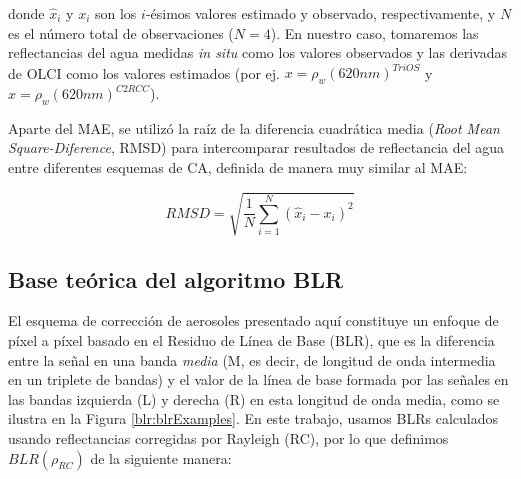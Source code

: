         \noindent donde $\hat{x}_{i}$ y $x_{i}$ son los $i$-ésimos valores estimado y observado, respectivamente, y $N$ es el número total de observaciones ($N=4$). En nuestro caso, tomaremos las reflectancias del agua medidas \textit{in situ} como los valores observados y las derivadas de OLCI como los valores estimados (por ej. $x=\rho_{w}(620 nm)^{TriOS}$ y $\hat{x}=\rho_{w}(620 nm)^{C2RCC}$). 

        Aparte del MAE, se utilizó la raíz de la diferencia cuadrática media (\textit{Root Mean Square-Diference}, RMSD) para intercomparar resultados de reflectancia del agua entre diferentes esquemas de CA, definida de manera muy similar al MAE:

        \begin{equation}
            RMSD = \sqrt{\frac{1}{N}\sum_{i=1}^{N} (\hat{x}_{i}-x_{i})^{2}}
            \label{blr:eq:RMSD}
        \end{equation}

    \subsection{Base teórica del algoritmo BLR}
    \label{blr:s:atb}

    
    
    
    
    El esquema de corrección de aerosoles presentado aquí constituye un enfoque de píxel a píxel basado en el Residuo de Línea de Base (BLR), que es la diferencia entre la señal en una banda \textit{media} (M, es decir, de longitud de onda intermedia en un triplete de bandas) y el valor de la línea de base formada por las señales en las bandas izquierda (L) y derecha (R) en esta longitud de onda media, como se ilustra en la Figura \ref{blr:blrExamples}. En este trabajo, usamos BLRs calculados usando reflectancias corregidas por Rayleigh (RC), por lo que definimos $BLR(\rho_{RC})$ de la siguiente manera:
    
